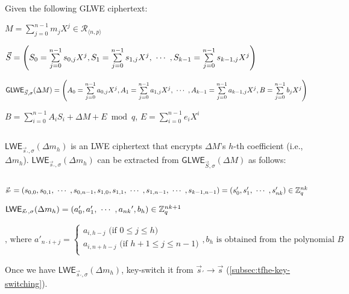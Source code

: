 \begin{tcolorbox}[title={\textbf{\tboxlabel{\ref*{subsec:tfhe-extraction}} GLWE Ciphertext's Coefficient Extraction}}]
Given the following GLWE ciphertext: 

$M = \sum\limits_{j=0}^{n-1}m_jX^j \in \mathcal{R}_{\langle n, p \rangle}$

$\vec{S} = \left(S_0 = \sum\limits_{j=0}^{n-1}s_{0,j}X^j, S_1 = \sum\limits_{j=0}^{n-1}s_{1,j}X^j, \text{ } \text{$\cdots$} \text{ }, S_{k-1} = \sum\limits_{j=0}^{n-1}s_{k-1,j}X^j \right)$

$\textsf{GLWE}_{\vec{S}, \sigma}(\Delta M) = \left(A_0 = \sum\limits_{j=0}^{n-1}a_{0,j}X^j, A_1 = \sum\limits_{j=0}^{n-1}a_{1,j}X^j, \text{ } \text{$\cdots$} \text{ }, A_{k-1} = \sum\limits_{j=0}^{n-1}a_{k-1,j}X^j, B = \sum\limits_{j=0}^{n-1}b_{j}X^j\right)$

$B = \sum\limits_{i=0}^{n-1}A_iS_i + \Delta M + E \bmod q$, \text{ } $E = \sum\limits_{i=0}^{n-1}e_iX^i$

$ $

$\textsf{LWE}_{\vec{s}_{'}, \sigma}(\Delta m_h)$ is an LWE ciphertext that encrypts $\Delta M$'s $h$-th coefficient (i.e., $\Delta m_h$). $\textsf{LWE}_{\vec{s}_{'}, \sigma}(\Delta m_h)$ can be extracted from $\textsf{GLWE}_{\vec{S}, \sigma}(\Delta M)$ as follows: 

$ $

$\vec{s}_{'} = (s_{0,0}, s_{0,1}, \text{ } \text{$\cdots$} \text{ }, s_{0,n-1}, s_{1,0}, s_{1,1}, \text{ } \text{$\cdots$} \text{ }, s_{1, n-1}, \text{ } \text{$\cdots$} \text{ }, s_{k-1, n-1}) = (s'_0, s'_1, \text{ } \text{$\cdots$} \text{ }, s'_{nk} ) \in \mathbb{Z}_q^{nk}$

$\textsf{LWE}_{\vec{s}_{'}, \sigma}(\Delta m_h) = (a_0', a_1', \text{ } \text{$\cdots$} \text{ } , a_{nk}{'}, b_h) \in \mathbb{Z}_q^{nk + 1}$


\[
    \text{, where } a'_{n \cdot i + j} =   
\begin{cases}
    a_{i,h - j} \text{ (if } 0 \leq j \leq h\text{)}\\
    a_{i,n + h - j} \text{ (if } h+1 \leq j \leq n-1\text{)}\\
\end{cases}
, b_h \text{ is obtained from the polynomial } B
\]

Once we have $\textsf{LWE}_{\vec{s}_{'}, \sigma}(\Delta m_h)$, key-switch it from $\vec{s}_{'} \rightarrow \vec{s}$ (\autoref{subsec:tfhe-key-switching}).

\end{tcolorbox}

